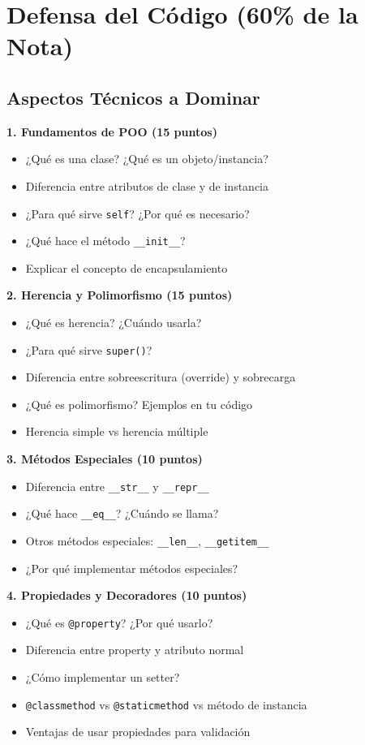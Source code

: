 \documentclass[11pt,letterpaper]{article}
\begin{document}
\section{Defensa del Código (60\% de la Nota)}

\subsection{Aspectos Técnicos a Dominar}

\textbf{1. Fundamentos de POO (15 puntos)}
\begin{itemize}
    \item ¿Qué es una clase? ¿Qué es un objeto/instancia?
    \item Diferencia entre atributos de clase y de instancia
    \item ¿Para qué sirve \texttt{self}? ¿Por qué es necesario?
    \item ¿Qué hace el método \texttt{\_\_init\_\_}?
    \item Explicar el concepto de encapsulamiento
\end{itemize}

\textbf{2. Herencia y Polimorfismo (15 puntos)}
\begin{itemize}
    \item ¿Qué es herencia? ¿Cuándo usarla?
    \item ¿Para qué sirve \texttt{super()}?
    \item Diferencia entre sobreescritura (override) y sobrecarga
    \item ¿Qué es polimorfismo? Ejemplos en tu código
    \item Herencia simple vs herencia múltiple
\end{itemize}

\textbf{3. Métodos Especiales (10 puntos)}
\begin{itemize}
    \item Diferencia entre \texttt{\_\_str\_\_} y \texttt{\_\_repr\_\_}
    \item ¿Qué hace \texttt{\_\_eq\_\_}? ¿Cuándo se llama?
    \item Otros métodos especiales: \texttt{\_\_len\_\_}, \texttt{\_\_getitem\_\_}
    \item ¿Por qué implementar métodos especiales?
\end{itemize}

\textbf{4. Propiedades y Decoradores (10 puntos)}
\begin{itemize}
    \item ¿Qué es \texttt{@property}? ¿Por qué usarlo?
    \item Diferencia entre property y atributo normal
    \item ¿Cómo implementar un setter?
    \item \texttt{@classmethod} vs \texttt{@staticmethod} vs método de instancia
    \item Ventajas de usar propiedades para validación
\end{itemize}
\end{document}
